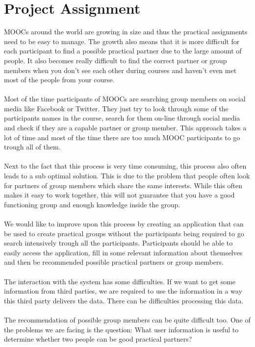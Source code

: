 \section{Project Assignment}
MOOCs around the world are growing in size and thus the practical assignments need to be easy to manage.
The growth also means that it is more difficult for each participant to find a possible practical partner due to the large amount of people.
It also becomes really difficult to find the correct partner or group members when you don't see each other during courses and haven't even met most of the people from your course.
\\\\
Most of the time participants of MOOCs are searching group members on social media like Facebook or Twitter.
They just try to look through some of the participants names in the course, search for them on-line through social media and check if they are a capable partner or group member.
This approach takes a lot of time and most of the time there are too much MOOC participants to go trough all of them.
\\\\
Next to the fact that this process is very time consuming, this process also often leads to a sub optimal solution.
This is due to the problem that people often look for partners of group members which share the same interests.
While this often makes it easy to work together, this will not guarantee that you have a good functioning group and enough knowledge inside the group.
\\\\
We would like to improve upon this process by creating an application that can be used to create practical groups without the participants being required to go search intensively trough all the participants.
Participants should be able to easily access the application, fill in some relevant information about themselves and then be recommended possible practical partners or group members.
\\\\
The interaction with the system has some difficulties.
If we want to get some information from third parties, we are required to use the information in a way this third party delivers the data.
There can be difficulties processing this data.
\\\\
The recommendation of possible group members can be quite difficult too.
One of the problems we are facing is the question: What user information is useful to determine whether two people can be good practical partners?

